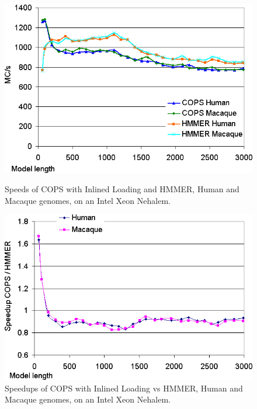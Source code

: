 \begin{figure}[H]
    \begin{minipage}{0.48\linewidth}
		\centering
		\includegraphics[scale=0.46]{graphics/inlined-tags-runtimes.png}
		\caption[Speeds of COPS with Inlined Loading and HMMER on an Intel Xeon Nehalem] 
		{Speeds of COPS with Inlined Loading and HMMER, Human and Macaque genomes, on an Intel Xeon Nehalem.}
		\label{inlined-tags-runtimes}
    \end{minipage}
    \hspace{0.04\linewidth}
    \begin{minipage}{0.48\linewidth}
		\centering
		\includegraphics[scale=0.46]{graphics/inlined-tags-speedups.png}
		\caption[Speedups of COPS with Inlined Loading vs HMMER on an Intel Xeon Nehalem] 
		{Speedups of COPS with Inlined Loading vs HMMER, Human and Macaque genomes, on an Intel Xeon Nehalem.}
		\label{inlined-tags-speedups}
    \end{minipage}
\end{figure} 

